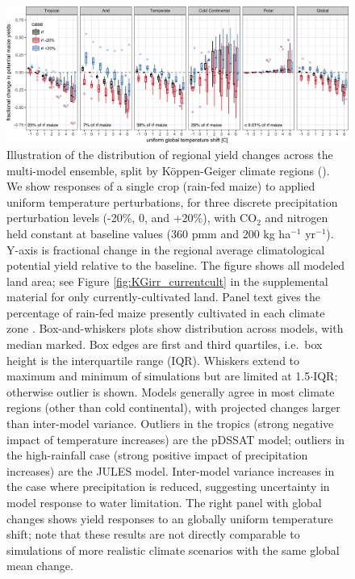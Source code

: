 \documentclass[preprint, 5p, times, twocolumn]{elsarticle}
\begin{document}
\begin{figure}[!b]
\centering
   \includegraphics[width=0.95\linewidth]{global_sim_CG.png}
   \caption{Illustration of the distribution of regional yield changes across the multi-model ensemble, split by K\"{o}ppen-Geiger climate regions (\cite{rubel2010}).
    We show responses of a single crop (rain-fed maize) to applied uniform temperature perturbations, for three discrete precipitation perturbation levels (-20\%, 0, and +20\%), with CO$_2$ and nitrogen held constant at baseline values (360 pmm and 200 kg ha$^{-1}$ yr$^{-1}$). Y-axis is fractional change in the regional average climatological potential yield relative to the baseline. The figure shows all modeled land area; see Figure \ref{fig:KGirr_currentcult} in the supplemental material for only currently-cultivated land. Panel text gives the percentage of rain-fed maize presently cultivated in each climate zone \citep{Portmann2010}. Box-and-whiskers plots show distribution across models, with median marked. Box edges are first and third quartiles, i.e.\ box height is the interquartile range (IQR). Whiskers extend to maximum and minimum of simulations but are limited at 1.5$\cdot$IQR; otherwise outlier is shown. Models generally agree in most climate regions (other than cold continental), with projected changes larger than inter-model variance.  Outliers in the tropics (strong negative impact of temperature increases) are the pDSSAT model; outliers in the high-rainfall case (strong positive impact of precipitation increases) are the JULES model. Inter-model variance increases in the case where precipitation is reduced, suggesting uncertainty in model response to water limitation. The right panel with global changes shows yield responses to an globally uniform temperature shift; note that these results are not directly comparable to simulations of more realistic climate scenarios with the same global mean change.}
   \label{fig:globesim}
\end{figure}
\end{document}
